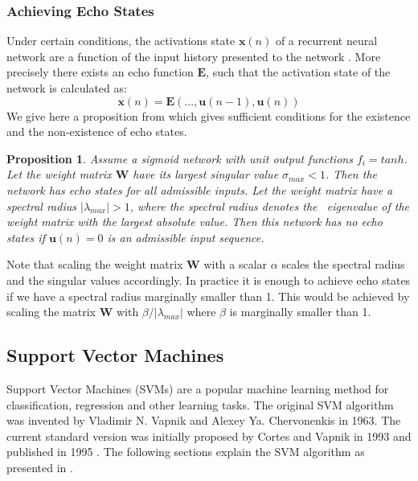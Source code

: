 \documentclass[a4paper,11pt,oneside]{article}
\newtheorem{prop}{Proposition}
\begin{document}
\subsubsection*{Achieving Echo States}
Under certain conditions, the activations state $\mathbf{x}(n)$ of a recurrent neural network are a function of 
the input history presented to the network \cite{jaeg6}. More precisely there exists an echo function $\mathbf{E}$, 
such that the activation state of the network is calculated as:
\begin{equation}
\mathbf{x}(n) = \mathbf{E}(...,\mathbf{u}(n-1),\mathbf{u}(n))
\end{equation}
We give here a proposition from \cite{jaeg6} which gives sufficient conditions for the existence and the 
non-existence of echo states.
\begin{prop}
Assume a sigmoid network with unit output functions $f_i=tanh$. Let the weight matrix $\mathbf{W}$ have its 
largest singular value $\sigma_{max} <1$. Then the network has echo states for all admissible inputs. 
Let the weight matrix have a spectral radius $|\lambda_{max}| > 1$, where the spectral radius denotes the \
eigenvalue of the weight matrix with the largest absolute value. Then this network has no echo states if 
$\mathbf{u}(n)=0$ is an admissible input sequence.
\end{prop}
Note that scaling the weight matrix $\mathbf{W}$ with a scalar $\alpha$ scales the spectral radius and the 
singular values accordingly. In practice it is enough to achieve echo states if we have a spectral radius 
marginally smaller than 1. This would be achieved by scaling the matrix $\mathbf{W}$ with $\beta/|\lambda_{max}|$ 
where $\beta$ is marginally smaller than 1.
\subsection{Support Vector Machines}
Support Vector Machines (SVMs) are a popular machine learning method for classification, regression 
and other learning tasks. The original SVM algorithm was invented by Vladimir N. Vapnik and Alexey Ya. 
Chervonenkis in 1963. The current standard version was initially proposed by Cortes and Vapnik in 1993 
and published in 1995 \cite{cortes1995support}. The following sections explain the SVM algorithm as presented 
in \cite{fletcher2009support,law2006simple,berwick2003idiot}.
\end{document}
